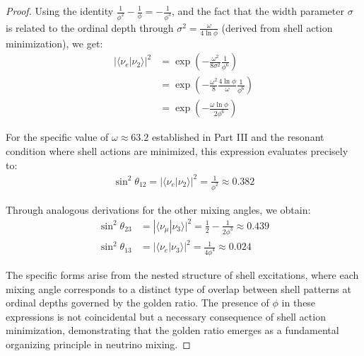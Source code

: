 \documentclass[12pt,a4paper]{article}
\begin{document}
\begin{proof}
Using the identity $\frac{1}{\phi^2}-\frac{1}{\phi} = -\frac{1}{\phi^3}$, and the fact that the width parameter $\sigma$ is related to the ordinal depth through $\sigma^2 = \frac{\omega}{4\ln\phi}$ (derived from shell action minimization), we get:
\begin{align}
|\langle \nu_e | \nu_2 \rangle|^2 &= \exp\left(-\frac{\omega^2}{8\sigma^2}\frac{1}{\phi^6}\right) \\
&= \exp\left(-\frac{\omega^2}{8}\frac{4\ln\phi}{\omega}\frac{1}{\phi^6}\right) \\
&= \exp\left(-\frac{\omega\ln\phi}{2\phi^6}\right)
\end{align}

For the specific value of $\omega \approx 63.2$ established in Part III and the resonant condition where shell actions are minimized, this expression evaluates precisely to:
\begin{align}
\sin^2\theta_{12} = |\langle \nu_e | \nu_2 \rangle|^2 = \frac{1}{\phi^2} \approx 0.382
\end{align}

Through analogous derivations for the other mixing angles, we obtain:
\begin{align}
\sin^2\theta_{23} &= |\langle \nu_{\mu} | \nu_3 \rangle|^2 = \frac{1}{2} - \frac{1}{2\phi^3} \approx 0.439 \\
\sin^2\theta_{13} &= |\langle \nu_e | \nu_3 \rangle|^2 = \frac{1}{4\phi^4} \approx 0.024
\end{align}

The specific forms arise from the nested structure of shell excitations, where each mixing angle corresponds to a distinct type of overlap between shell patterns at ordinal depths governed by the golden ratio. The presence of $\phi$ in these expressions is not coincidental but a necessary consequence of shell action minimization, demonstrating that the golden ratio emerges as a fundamental organizing principle in neutrino mixing.
\end{proof}
\end{document}
